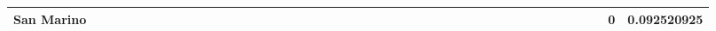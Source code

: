 \documentclass[a4paper,11pt]{report}
\begin{document}
\begin{appendices}
\begin{landscape}
\begin{longtable}{r|r|r|r|r|r|r|r|r|r|r|r|r|r|r|r|r|r|r|r|r|r|r|r|r|r|r|r|r|r|r|r|r|r|r|r|r|r|r|r|r|r|r|r|}
\multicolumn{1}{|r|}{\textbf{San Marino}}      &                                       &                                       &                                       &                                          &                                       &                                       &                                        &                                       &                                      &                                       &                                       &                                                &                                       &                                      &                                       &                                       &                                      &                                       &                                       &                                       &                                      &                                     &                                      &                                         &                                     &                                       &                                          &                                      &                                       &                                      &                                          &                                      &                                        &                                     &                                      &                                           &                                               &                                       &                                              &                                      &                                     & 0                                             & 0.092520925                             \\ \hline

\end{longtable}
\end{landscape}
\end{appendices}
\end{document}
